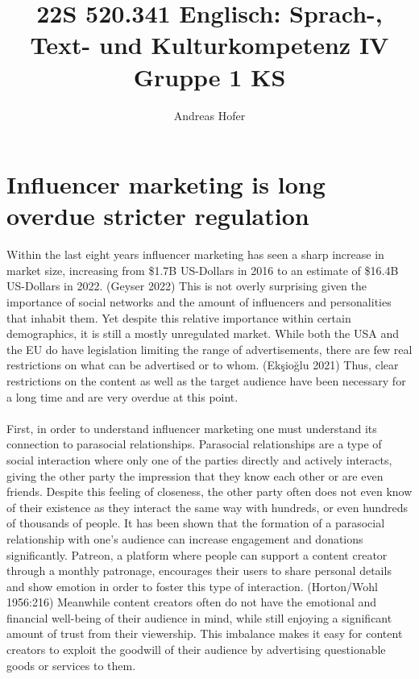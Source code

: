 \documentclass{article}
\title{\vspace{-3cm}22S 520.341 Englisch: Sprach-, Text- und Kulturkompetenz IV Gruppe 1 KS}
\author{Andreas Hofer}
\begin{document}
	\begingroup
	\section*{Influencer marketing is long overdue stricter regulation}
	\setlength{\parindent}{0pt}
	Within the last eight years influencer marketing has seen a sharp increase in market size, increasing from \$1.7B US-Dollars in 2016 to an estimate of \$16.4B US-Dollars in 2022. (Geyser 2022) This is not overly surprising given the importance of social networks and the amount of influencers and personalities that inhabit them. Yet despite this relative importance within certain demographics, it is still a mostly unregulated market. While both the USA and the EU do have legislation limiting the range of advertisements, there are few real restrictions on what can be advertised or to whom. (Ekşioğlu 2021) Thus, clear restrictions on the content as well as the target audience have been necessary for a long time and are very overdue at this point. \\ \\

	First, in order to understand influencer marketing one must understand its connection to parasocial relationships. Parasocial relationships are a type of social interaction where only one of the parties directly and actively interacts, giving the other party the impression that they know each other or are even friends. Despite this feeling of closeness, the other party often does not even know of their existence as they interact the same way with hundreds, or even hundreds of thousands of people. It has been shown that the formation of a parasocial relationship with one's audience can increase engagement and donations significantly. Patreon, a platform where people can support a content creator through a monthly patronage, encourages their users to share personal details and show emotion in order to foster this type of interaction. (Horton/Wohl 1956:216) Meanwhile content creators often do not have the emotional and financial well-being of their audience in mind, while still enjoying a significant amount of trust from their viewership. This imbalance makes it easy for content creators to exploit the goodwill of their audience by advertising questionable goods or services to them. \\ \\
\end{document}

